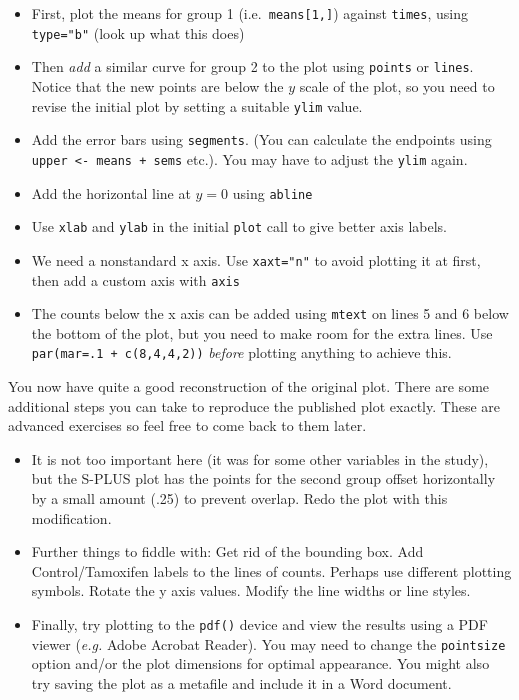 \documentclass[
]{book}
\providecommand{\tightlist}{%
  \setlength{\itemsep}{0pt}\setlength{\parskip}{0pt}}
\begin{document}
\begin{itemize}
\tightlist
\item
  First, plot the means for group 1 (i.e.~\texttt{means{[}1,{]}}) against
  \texttt{times}, using \texttt{type="b"} (look up what this does)
\item
  Then \emph{add} a similar curve for group 2 to the plot using
  \texttt{points} or \texttt{lines}. Notice that the new points are below the \(y\)
  scale of the plot, so you need to revise the initial plot by setting
  a suitable \texttt{ylim} value.
\item
  Add the error bars using \texttt{segments}. (You can calculate the
  endpoints using \texttt{upper\ \textless{}-\ means\ +\ sems} etc.). You may have to
  adjust the \texttt{ylim} again.
\item
  Add the horizontal line at \(y=0\) using \texttt{abline}
\item
  Use \texttt{xlab} and \texttt{ylab} in the initial \texttt{plot} call to give better axis labels.
\item
  We need a nonstandard x axis. Use \texttt{xaxt="n"} to avoid plotting
  it at first, then add a custom axis with \texttt{axis}
\item
  The counts below the x axis can be added using \texttt{mtext} on
  lines 5 and 6 below the bottom of the plot, but you need to make
  room for the extra lines. Use \texttt{par(mar=.1\ +\ c(8,4,4,2))}
  \emph{before} plotting anything to achieve this.
\end{itemize}

You now have quite a good reconstruction of the original plot. There
are some additional steps you can take to reproduce the published plot
exactly. These are advanced exercises so feel free to come back to
them later.

\begin{itemize}
\tightlist
\item
  It is not too important here (it was for some other variables
  in the study), but the S-PLUS plot has the points for the second
  group offset horizontally by a small amount (.25) to prevent
  overlap. Redo the plot with this modification.
\item
  Further things to fiddle with: Get rid of the bounding box.
  Add Control/Tamoxifen labels to the lines of counts. Perhaps use
  different plotting symbols. Rotate the y axis values. Modify the
  line widths or line styles.
\item
  Finally, try plotting to the \texttt{pdf()} device and view
  the results using a PDF viewer (\emph{e.g.} Adobe Acrobat
  Reader). You may need to change the \texttt{pointsize} option
  and/or the plot dimensions for optimal appearance. You might
  also try saving the plot as a metafile and include it in a Word
  document.
\end{itemize}
\end{document}

